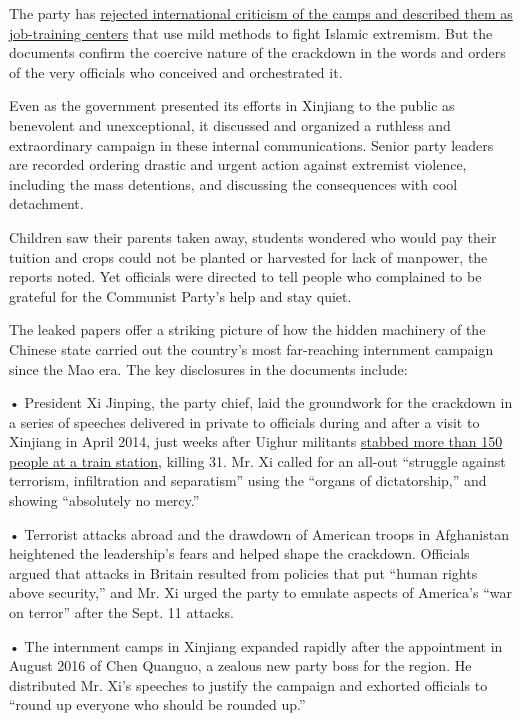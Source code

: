 The party has
\href{https://www.nytimes.com/2019/03/12/world/asia/china-xinjiang.html}{rejected
international criticism of the camps and described them as job-training
centers} that use mild methods to fight Islamic extremism. But the
documents confirm the coercive nature of the crackdown in the words and
orders of the very officials who conceived and orchestrated it.

Even as the government presented its efforts in Xinjiang to the public
as benevolent and unexceptional, it discussed and organized a ruthless
and extraordinary campaign in these internal communications. Senior
party leaders are recorded ordering drastic and urgent action against
extremist violence, including the mass detentions, and discussing the
consequences with cool detachment.

Children saw their parents taken away, students wondered who would pay
their tuition and crops could not be planted or harvested for lack of
manpower, the reports noted. Yet officials were directed to tell people
who complained to be grateful for the Communist Party's help and stay
quiet.

The leaked papers offer a striking picture of how the hidden machinery
of the Chinese state carried out the country's most far-reaching
internment campaign since the Mao era. The key disclosures in the
documents include:

• President Xi Jinping, the party chief, laid the groundwork for the
crackdown in a series of speeches delivered in private to officials
during and after a visit to Xinjiang in April 2014, just weeks after
Uighur militants
\href{https://www.nytimes.com/2015/03/25/world/asia/china-executes-3-over-deadly-knife-attack-at-train-station-in-2014.html}{stabbed
more than 150 people at a train station}, killing 31. Mr. Xi called for
an all-out ``struggle against terrorism, infiltration and separatism''
using the ``organs of dictatorship,'' and showing ``absolutely no
mercy.''

• Terrorist attacks abroad and the drawdown of American troops in
Afghanistan heightened the leadership's fears and helped shape the
crackdown. Officials argued that attacks in Britain resulted from
policies that put ``human rights above security,'' and Mr. Xi urged the
party to emulate aspects of America's ``war on terror'' after the Sept.
11 attacks.

• The internment camps in Xinjiang expanded rapidly after the
appointment in August 2016 of Chen Quanguo, a zealous new party boss for
the region. He distributed Mr. Xi's speeches to justify the campaign and
exhorted officials to ``round up everyone who should be rounded up.''

